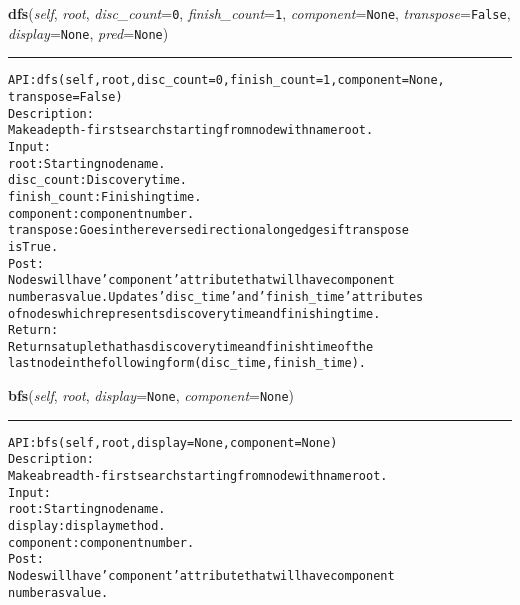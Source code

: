 \hspace{.8\funcindent}\begin{boxedminipage}{\funcwidth}

    \raggedright \textbf{dfs}(\textit{self}, \textit{root}, \textit{disc\_count}={\tt 0}, \textit{finish\_count}={\tt 1}, \textit{component}={\tt None}, \textit{transpose}={\tt False}, \textit{display}={\tt None}, \textit{pred}={\tt None})

    \vspace{-1.5ex}

    \rule{\textwidth}{0.5\fboxrule}
\setlength{\parskip}{2ex}
\begin{alltt}

API: dfs(self, root, disc\_count = 0, finish\_count = 1, component=None,
    transpose=False)
Description:
Make a depth-first search starting from node with name root.
Input:
    root: Starting node name.
    disc\_count: Discovery time.
    finish\_count: Finishing time.
    component: component number.
    transpose: Goes in the reverse direction along edges if transpose
    is True.
Post:
    Nodes will have 'component' attribute that will have component
    number as value. Updates 'disc\_time' and 'finish\_time' attributes
    of nodes which represents discovery time and finishing time.
Return:
    Returns a tuple that has discovery time and finish time of the
    last node in the following form (disc\_time,finish\_time).
\end{alltt}

\setlength{\parskip}{1ex}
    \end{boxedminipage}

    \label{coinor:gimpy:graph:Graph:bfs}

    \vspace{0.5ex}

\hspace{.8\funcindent}\begin{boxedminipage}{\funcwidth}

    \raggedright \textbf{bfs}(\textit{self}, \textit{root}, \textit{display}={\tt None}, \textit{component}={\tt None})

    \vspace{-1.5ex}

    \rule{\textwidth}{0.5\fboxrule}
\setlength{\parskip}{2ex}
\begin{alltt}

API: bfs(self, root, display = None, component=None)
Description:
Make a breadth-first search starting from node with name root.
Input:
    root: Starting node name.
    display: display method.
    component: component number.
Post:
    Nodes will have 'component' attribute that will have component
    number as value.
\end{alltt}

\setlength{\parskip}{1ex}
    \end{boxedminipage}

